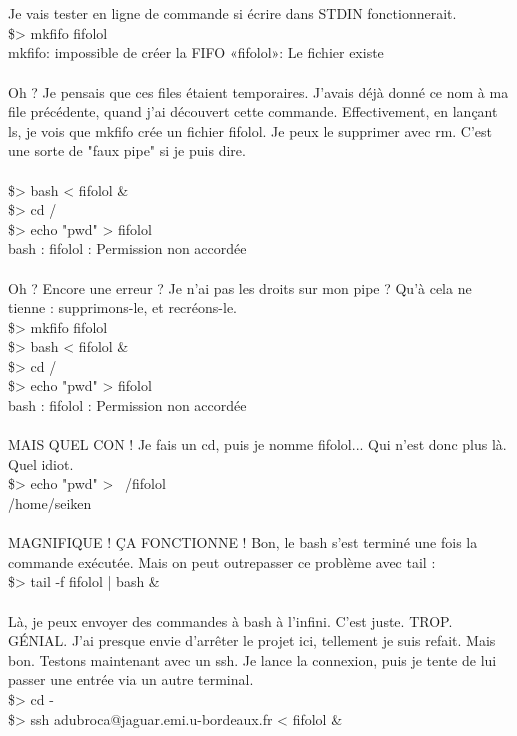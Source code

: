 \\\\
Je vais tester en ligne de commande si écrire dans STDIN fonctionnerait.
\\\$> mkfifo fifolol
\\mkfifo: impossible de créer la FIFO «fifolol»: Le fichier existe
\\\\
Oh ? Je pensais que ces files étaient temporaires. J'avais déjà donné ce nom à ma file précédente, quand j'ai découvert cette commande. Effectivement, en lançant ls, je vois que mkfifo crée un fichier fifolol. Je peux le supprimer avec rm. C'est une sorte de "faux pipe" si je puis dire.
\\\\
\$> bash < fifolol \&
\\\$> cd /
\\\$> echo "pwd" > fifolol
\\bash : fifolol : Permission non accordée
\\\\
Oh ? Encore une erreur ? Je n'ai pas les droits sur mon pipe ? Qu'à cela ne tienne : supprimons-le, et recréons-le.
\\\$> mkfifo fifolol
\\\$> bash < fifolol \&
\\\$> cd /
\\\$> echo "pwd" > fifolol
\\bash : fifolol : Permission non accordée
\\\\
MAIS QUEL CON ! Je fais un cd, puis je nomme fifolol... Qui n'est donc plus là. Quel idiot.
\\\$> echo "pwd" > ~/fifolol
\\/home/seiken
\\\\
MAGNIFIQUE ! ÇA FONCTIONNE ! Bon, le bash s'est terminé une fois la commande exécutée. Mais on peut outrepasser ce problème avec tail :
\\\$> tail -f fifolol | bash \&
\\\\
Là, je peux envoyer des commandes à bash à l'infini. C'est juste. TROP. GÉNIAL. J'ai presque envie d'arrêter le projet ici, tellement je suis refait. Mais bon. Testons maintenant avec un ssh. Je lance la connexion, puis je tente de lui passer une entrée via un autre terminal.
\\\$> cd -
\\\$> ssh adubroca@jaguar.emi.u-bordeaux.fr < fifolol \&

